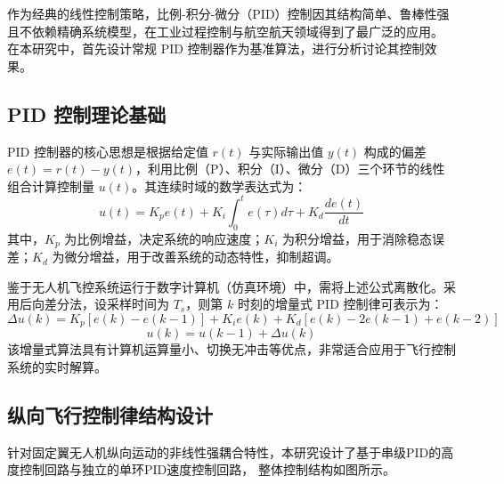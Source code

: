 \documentclass[UTF8, a4paper, 12pt]{ctexart}
\begin{document}
作为经典的线性控制策略，比例-积分-微分（PID）控制因其结构简单、鲁棒性强且不依赖精确系统模型，在工业过程控制与航空航天领域得到了最广泛的应用。
在本研究中，首先设计常规 PID 控制器作为基准算法，进行分析讨论其控制效果。

\subsection{PID 控制理论基础}
PID 控制器的核心思想是根据给定值 $r(t)$ 与实际输出值 $y(t)$ 构成的偏差 $e(t) = r(t) - y(t)$，利用比例（P）、积分（I）、微分（D）三个环节的线性组合计算控制量 $u(t)$。其连续时域的数学表达式为：
\begin{equation}
    u(t) = K_p e(t) + K_i \int_{0}^{t} e(\tau) d\tau + K_d \frac{de(t)}{dt}
\end{equation}
其中，$K_p$ 为比例增益，决定系统的响应速度；$K_i$ 为积分增益，用于消除稳态误差；$K_d$ 为微分增益，用于改善系统的动态特性，抑制超调。

鉴于无人机飞控系统运行于数字计算机（仿真环境）中，需将上述公式离散化。采用后向差分法，设采样时间为 $T_s$，则第 $k$ 时刻的增量式 PID 控制律可表示为：
\begin{equation}
    \Delta u(k) = K_p [e(k) - e(k-1)] + K_i e(k) + K_d [e(k) - 2e(k-1) + e(k-2)]
\end{equation}
\begin{equation}
    u(k) = u(k-1) + \Delta u(k)
\end{equation}
该增量式算法具有计算机运算量小、切换无冲击等优点，非常适合应用于飞行控制系统的实时解算。

\subsection{纵向飞行控制律结构设计}
针对固定翼无人机纵向运动的非线性强耦合特性，本研究设计了基于串级PID的高度控制回路与独立的单环PID速度控制回路，
整体控制结构如图所示。
\end{document}
